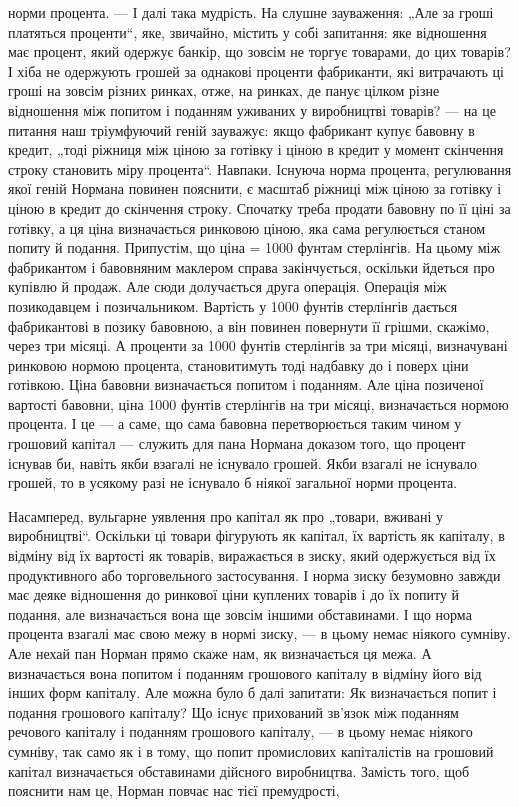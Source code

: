\parcont{}  %
норми процента. — І далі така мудрість. На слушне зауваження:
„Але за гроші платяться проценти“, яке, звичайно, містить у собі
запитання: яке відношення має процент, який одержує банкір,
що зовсім не торгує товарами, до цих товарів? І хіба не одержують грошей за однакові проценти
фабриканти, які витрачають
ці гроші на зовсім різних ринках, отже, на ринках, де панує
цілком різне відношення між попитом і поданням уживаних у виробництві товарів? — на це питання наш
тріумфуючий геній зауважує: якщо фабрикант купує бавовну в кредит, „тоді ріжниця між ціною за
готівку і ціною в кредит у момент скінчення строку становить міру процента“. Навпаки. Існуюча норма
процента, регулювання якої геній Нормана повинен пояснити, є масштаб ріжниці
між ціною за готівку і ціною в кредит до скінчення строку. Спочатку треба продати бавовну по її ціні
за готівку, а ця ціна визначається ринковою ціною, яка сама регулюється станом попиту
й подання. Припустім, що ціна = 1000 фунтам стерлінгів. На цьому
між фабрикантом і бавовняним маклером справа закінчується,
оскільки йдеться про купівлю й продаж. Але сюди долучається
друга операція. Операція між позикодавцем і позичальником. Вартість у 1000 фунтів стерлінгів дається
фабрикантові в позику бавовною, а він повинен повернути її грішми, скажімо, через три місяці. А
проценти за 1000 фунтів стерлінгів за три місяці, визначувані
ринковою нормою процента, становитимуть тоді надбавку до і поверх ціни готівкою. Ціна бавовни
визначається попитом і поданням.
Але ціна позиченої вартості бавовни, ціна 1000 фунтів стерлінгів на
три місяці, визначається нормою процента. І це — а саме, що сама
бавовна перетворюється таким чином у грошовий капітал — служить для пана Нормана доказом того, що
процент існував би, навіть
якби взагалі не існувало грошей. Якби взагалі не існувало грошей,
то в усякому разі не існувало б ніякої загальної норми процента.

Насамперед, вульгарне уявлення про капітал як про „товари,
вживані у виробництві“. Оскільки ці товари фігурують як капітал, їх вартість як капіталу, в відміну
від їх вартості як товарів, виражається в зиску, який одержується від їх продуктивного або
торговельного застосування. І норма зиску безумовно
завжди має деяке відношення до ринкової ціни куплених товарів
і до їх попиту й подання, але визначається вона ще зовсім іншими
обставинами. І що норма процента взагалі має свою межу в нормі
зиску, — в цьому немає ніякого сумніву. Але нехай пан Норман
прямо скаже нам, як визначається ця межа. А визначається
вона попитом і поданням грошового капіталу в відміну його від
інших форм капіталу. Але можна було б далі запитати: Як визначається попит і подання грошового
капіталу? Що існує прихований зв’язок між поданням речового капіталу і поданням грошового капіталу,
— в цьому немає ніякого сумніву, так само як
і в тому, що попит промислових капіталістів на грошовий капітал визначається обставинами дійсного
виробництва. Замість
того, щоб пояснити нам це, Норман повчає нас тієї премудрості,
\parbreak{}  %
